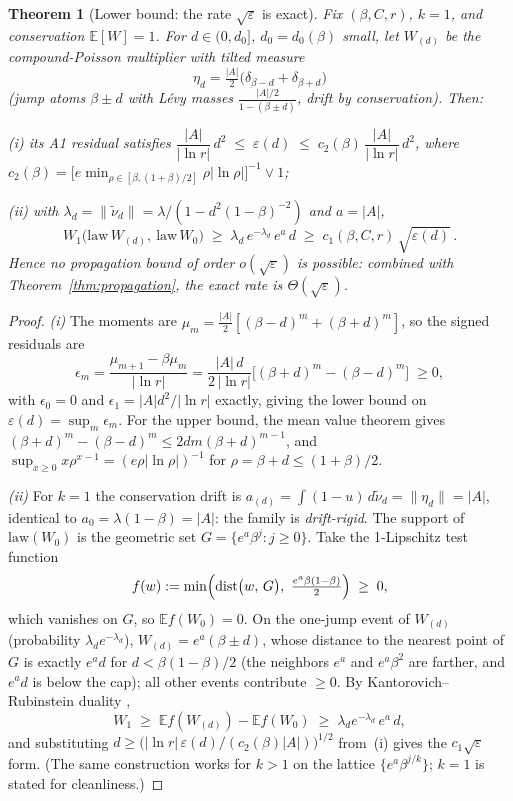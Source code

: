 \documentclass[pdflatex,sn-mathphys-num]{sn-jnl}
\theoremstyle{thmstyleone}
\newtheorem{theorem}{Theorem}
\theoremstyle{thmstyletwo}
\theoremstyle{thmstylethree}
\DeclareMathOperator{\dist}{dist}
\begin{document}
\begin{theorem}[Lower bound: the rate $\sqrt\varepsilon$ is
exact]\label{thm:lower}
Fix $(\beta, C, r)$, $k = 1$, and conservation $\mathbb{E}[W]=1$.
For $d \in (0, d_0]$, $d_0 = d_0(\beta)$ small, let $W_{(d)}$ be the
compound-Poisson multiplier with tilted measure
\[
  \eta_d = \tfrac{|A|}{2}\bigl(\delta_{\beta-d} +
  \delta_{\beta+d}\bigr)
\]
(jump atoms $\beta\pm d$ with L\'evy masses
$\tfrac{|A|/2}{1-(\beta\pm d)}$, drift by conservation).  Then:

\textup{(i)} its A1 residual satisfies
$\dfrac{|A|}{|\ln r|}\,d^2 \;\le\; \varepsilon(d) \;\le\;
c_2(\beta)\,\dfrac{|A|}{|\ln r|}\,d^2$, where $c_2(\beta) =
\bigl[e\min_{\rho\in[\beta,(1+\beta)/2]}\rho|\ln\rho|\bigr]^{-1}
\vee 1$;

\textup{(ii)} with $\lambda_d = \|\tilde\nu_d\| =
\lambda/(1 - d^2(1-\beta)^{-2})$ and $a = |A|$,
\[
  W_1\bigl(\mathrm{law}\,W_{(d)},\ \mathrm{law}\,W_0\bigr)
  \;\ge\; \lambda_d\,e^{-\lambda_d}\,e^{a}\,d
  \;\ge\; c_1(\beta, C, r)\,\sqrt{\varepsilon(d)}\,.
\]
Hence no propagation bound of order $o(\sqrt\varepsilon)$ is
possible: combined with Theorem~\ref{thm:propagation}, the exact
rate is $\Theta(\sqrt\varepsilon)$.
\end{theorem}

\begin{proof}
\textit{(i)}  The moments are $\mu_m =
\tfrac{|A|}{2}[(\beta-d)^m + (\beta+d)^m]$, so the signed residuals
are
\[
  \epsilon_m = \frac{\mu_{m+1} - \beta\mu_m}{|\ln r|}
  = \frac{|A|\,d}{2\,|\ln r|}
  \bigl[(\beta+d)^m - (\beta-d)^m\bigr] \;\ge 0,
\]
with $\epsilon_0 = 0$ and $\epsilon_1 = |A|d^2/|\ln r|$ exactly,
giving the lower bound on $\varepsilon(d) = \sup_m \epsilon_m$.  For
the upper bound, the mean value theorem gives $(\beta+d)^m -
(\beta-d)^m \le 2dm(\beta+d)^{m-1}$, and $\sup_{x\ge0} x\rho^{x-1} =
(e\rho|\ln\rho|)^{-1}$ for $\rho = \beta+d \le (1+\beta)/2$.

\textit{(ii)}  For $k=1$ the conservation drift is
$a_{(d)} = \int(1-u)\,d\tilde\nu_d = \|\eta_d\| = |A|$, identical to
$a_0 = \lambda(1-\beta) = |A|$: the family is \emph{drift-rigid}.
The support of $\mathrm{law}(W_0)$ is the geometric set $G =
\{e^{a}\beta^j : j \ge 0\}$.  Take the 1-Lipschitz test function
\[
  f(w) := \min\Bigl(\dist\bigl(w,\,G\bigr),\
  \tfrac{e^a\beta(1-\beta)}{2}\Bigr) \;\ge\; 0,
\]
which vanishes on $G$, so $\mathbb{E}f(W_0) = 0$.  On the one-jump
event of $W_{(d)}$ (probability $\lambda_d e^{-\lambda_d}$),
$W_{(d)} = e^{a}(\beta\pm d)$, whose distance to the nearest point
of $G$ is exactly $e^a d$ for $d < \beta(1-\beta)/2$ (the
neighbors $e^a$ and $e^a\beta^2$ are farther, and $e^ad$ is below
the cap); all other events contribute $\ge 0$.  By
Kantorovich--Rubinstein duality \cite{Vil09},
\[
  W_1 \;\ge\; \mathbb{E}f(W_{(d)}) - \mathbb{E}f(W_0)
  \;\ge\; \lambda_d e^{-\lambda_d}\,e^{a}\,d,
\]
and substituting $d \ge \bigl(|\ln r|\,\varepsilon(d) / (c_2(\beta)
|A|)\bigr)^{1/2}$ from~(i) gives the $c_1\sqrt{\varepsilon}$ form.
(The same construction works for $k > 1$ on the lattice
$\{e^{a}\beta^{j/k}\}$; $k = 1$ is stated for cleanliness.)
\end{proof}
\end{document}
